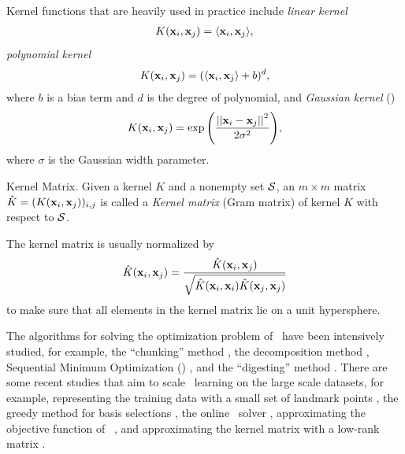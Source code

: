 {Kernel functions that are heavily used in practice include \textit{linear kernel}
\begin{align*}
	K(\mathbf {x}_i,\mathbf {x}_j) = \langle \mathbf {x}_i, \mathbf {x}_j \rangle,
\end{align*}
\textit{polynomial kernel}
\begin{align*}
	K(\mathbf {x}_i,\mathbf {x}_j) = (\langle \mathbf {x}_i, \mathbf {x}_j \rangle + b)^d,
\end{align*}
where $b$ is a bias term and $d$ is the degree of polynomial, and \textit{Gaussian kernel} (\rbf)
\begin{align*}
	K(\mathbf {x}_i,\mathbf {x}_j) = \exp{\left(\frac{\left|\left| {\mathbf {x}_i}-{\mathbf {x}_j} \right|\right|^2}{2\sigma^2}\right)},
\end{align*}
where $\sigma$ is the Gaussian width parameter.
\begin{definition}{Kernel Matrix.}
	Given a kernel $K$ and a nonempty set $\mathcal{S}$, an $m\times m$ matrix $\hat{K}=(K(\mathbf {x}_i,\mathbf {x}_j))_{i,j}$ is called a \textit{Kernel matrix} (Gram matrix) of kernel $K$ with respect to $\mathcal{S}$.
\end{definition}
\noindent
The kernel matrix is usually normalized by
\begin{align*}
	\hat{K}(\mathbf {x}_i,\mathbf {x}_j) = \frac{\hat{K}(\mathbf {x}_i,\mathbf {x}_j)}{\sqrt{\hat{K}(\mathbf {x}_i,\mathbf {x}_i)\hat{K}(\mathbf {x}_j,\mathbf {x}_j)}}
\end{align*}
to make sure that all elements in the kernel matrix lie on a unit hypersphere.

The algorithms for solving the optimization problem of \svm\ have been intensively studied, for example, 
the ``chunking'' method \citep{Vapnik82estimation,Perezcruz04double}, 
the decomposition method \citep{Osuna97an,Joachims98making}, 
{Sequential Minimum Optimization} (\smo) \citep{Platt98sequential,Platt99fast}, 
and the ``digesting'' method \citep{Decoste02support}.
There are some recent studies that aim to scale \svm\ learning on the large scale datasets, for example, 
representing the training data with a small set of landmark points \citep{Pavlov00towards,Boley04training,Yu05making,Zhang08improved}, 
the greedy method for basis selections \citep{Keerthi06building}, 
the online \svm\ solver \citep{Bordes05fast}, 
approximating the objective function of \svm\ \citep{Zhang12scaling, Le13fast}, 
and approximating the kernel matrix with a low-rank matrix \citep{Smola00sparse,Fine02efficient,Drineas05on,Si14memory}.



}
